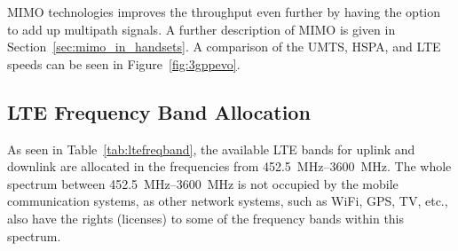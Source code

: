 MIMO technologies improves the throughput even further by having the option to add up multipath signals. A further description of MIMO is given in Section~\ref{sec:mimo_in_handsets}. A comparison of the UMTS, HSPA, and LTE speeds can be seen in Figure~\ref{fig:3gppevo}.


\subsection{LTE Frequency Band Allocation}
As seen in Table~\ref{tab:ltefreqband}, the available LTE bands for uplink and downlink are allocated in the frequencies from \SIrange{452.5}{3600}{MHz}. The whole spectrum between \SIrange{452.5}{3600}{MHz} is not occupied by the mobile communication systems, as other network systems, such as WiFi, GPS, TV, etc., also have the rights (licenses) to some of the frequency bands within this spectrum.

